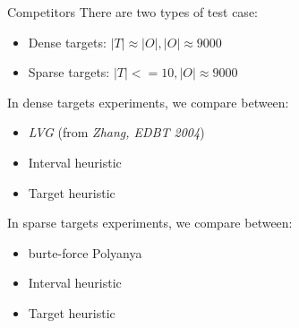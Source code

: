 \begin{frame}{Competitors}
\small{There are two types of test case:}
\begin{itemize}
    \item<1-> \small{Dense targets: $|T| \approx |O|, |O| \approx 9000$}
    \item<1-> \small{Sparse targets: $|T| <= 10, |O| \approx 9000$}
\end{itemize}
\small{In dense targets experiments, we compare between:}
\begin{itemize}
    \item<1-> \small{\textit{LVG} (from \textit{Zhang, EDBT 2004})}
    \item<1-> \small{Interval heuristic}
    \item<1-> \small{Target heuristic}
\end{itemize}
\small{In sparse targets experiments, we compare between:}
\begin{itemize}
    \item<1-> \small{burte-force Polyanya}
    \item<1-> \small{Interval heuristic}
    \item<1-> \small{Target heuristic}
\end{itemize}
\end{frame}


